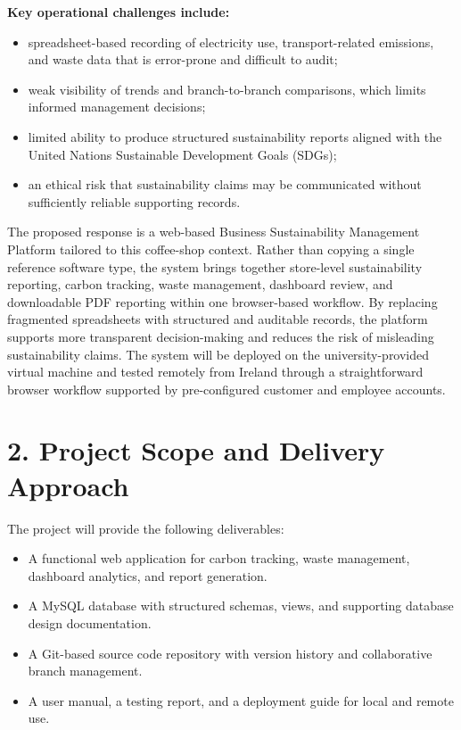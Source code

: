 \documentclass[10pt,a4paper]{article}
\begin{document}
\textbf{Key operational challenges include:}
\begin{itemize}[leftmargin=1.2em,itemsep=1pt,topsep=2pt]
    \item spreadsheet-based recording of electricity use, transport-related emissions, and waste data that is error-prone and difficult to audit;
    \item weak visibility of trends and branch-to-branch comparisons, which limits informed management decisions;
    \item limited ability to produce structured sustainability reports aligned with the United Nations Sustainable Development Goals (SDGs);
    \item an ethical risk that sustainability claims may be communicated without sufficiently reliable supporting records.
\end{itemize}

The proposed response is a web-based Business Sustainability Management Platform tailored to this coffee-shop context. Rather than copying a single reference software type, the system brings together store-level sustainability reporting, carbon tracking, waste management, dashboard review, and downloadable PDF reporting within one browser-based workflow. By replacing fragmented spreadsheets with structured and auditable records, the platform supports more transparent decision-making and reduces the risk of misleading sustainability claims. The system will be deployed on the university-provided virtual machine and tested remotely from Ireland through a straightforward browser workflow supported by pre-configured customer and employee accounts.

\section*{2. Project Scope and Delivery Approach}
The project will provide the following deliverables:
\begin{itemize}[leftmargin=1.2em,itemsep=1pt,topsep=2pt]
    \item A functional web application for carbon tracking, waste management, dashboard analytics, and report generation.
    \item A MySQL database with structured schemas, views, and supporting database design documentation.
    \item A Git-based source code repository with version history and collaborative branch management.
    \item A user manual, a testing report, and a deployment guide for local and remote use.
\end{itemize}
\end{document}
